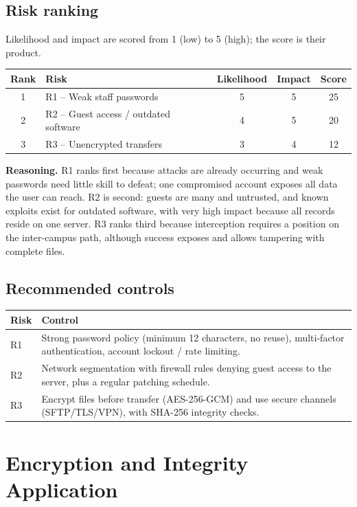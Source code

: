 \documentclass[11pt,a4paper]{article}
\begin{document}
\subsection{Risk ranking}
Likelihood and impact are scored from 1 (low) to 5 (high); the score is their product.
\begin{center}
\begin{tabular}{@{}clccc@{}}
\toprule
Rank & Risk & Likelihood & Impact & Score\\ \midrule
1 & R1 -- Weak staff passwords & 5 & 5 & 25\\
2 & R2 -- Guest access / outdated software & 4 & 5 & 20\\
3 & R3 -- Unencrypted transfers & 3 & 4 & 12\\ \bottomrule
\end{tabular}
\end{center}
\textbf{Reasoning.} R1 ranks first because attacks are already occurring and weak passwords need little skill to
defeat; one compromised account exposes all data the user can reach. R2 is second: guests are many and untrusted, and
known exploits exist for outdated software, with very high impact because all records reside on one server. R3 ranks
third because interception requires a position on the inter-campus path, although success exposes and allows tampering with complete files.

\subsection{Recommended controls}
\begin{center}
\begin{tabular}{@{}lp{11cm}@{}}
\toprule
Risk & Control\\ \midrule
R1 & Strong password policy (minimum 12 characters, no reuse), multi-factor authentication, account lockout / rate limiting.\\
R2 & Network segmentation with firewall rules denying guest access to the server, plus a regular patching schedule.\\
R3 & Encrypt files before transfer (AES-256-GCM) and use secure channels (SFTP/TLS/VPN), with SHA-256 integrity checks.\\
\bottomrule
\end{tabular}
\end{center}

\section{Encryption and Integrity Application}
\end{document}
